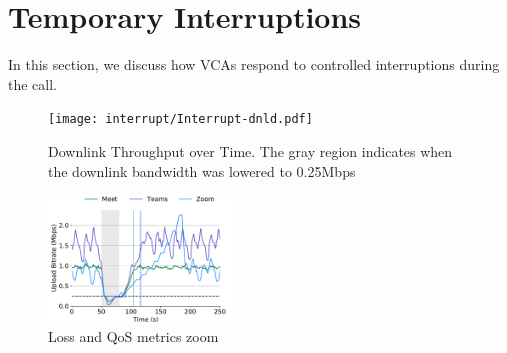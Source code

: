\section{Temporary Interruptions}
In this section, we discuss how VCAs respond to controlled interruptions during the call.  

\begin{figure}[]
    \centering
    \texttt{[image: interrupt/Interrupt-dnld.pdf]}
    \caption{Downlink Throughput over Time. The gray region indicates when the downlink bandwidth was lowered to 0.25Mbps}
    \label{fig:interrupt-dnld}
\end{figure}
\begin{figure}[]
    \centering
    \includegraphics[width=0.45\textwidth,keepaspectratio]{../figures/interrupt/Interrupt-upld.pdf}
    \caption{Loss and QoS metrics zoom}
    \label{fig:Interrupt_upld}
\end{figure}


